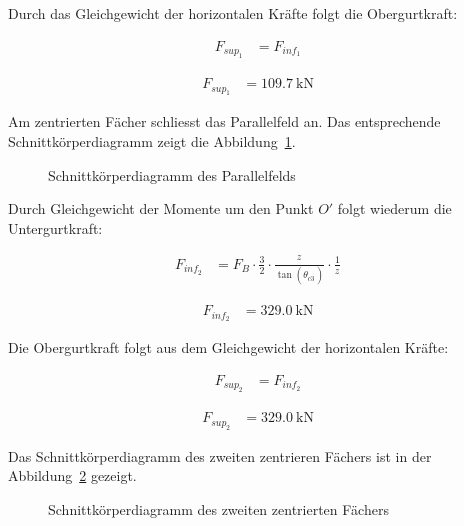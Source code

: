 \documentclass[
  11pt,
  letterpaper,
]{scrreprt}
\begin{document}
Durch das Gleichgewicht der horizontalen Kräfte folgt die Obergurtkraft:

$$
\begin{aligned}
F_{sup_{1}} &= F_{inf_{1}} \; 
\end{aligned}
$$

$$
\begin{aligned}
F_{sup_{1}} &= 109.7\ \mathrm{kN} \; 
\end{aligned}
$$

Am zentrierten Fächer schliesst das Parallelfeld an. Das entsprechende
Schnittkörperdiagramm zeigt die
Abbildung~\ref{fig-skd_2_spannungsfelder_sv14}.

\begin{figure}[H]


\caption{\label{fig-skd_2_spannungsfelder_sv14}Schnittkörperdiagramm des
Parallelfelds}

\end{figure}%

Durch Gleichgewicht der Momente um den Punkt \(O'\) folgt wiederum die
Untergurtkraft:

$$
\begin{aligned}
F_{inf_{2}} &= F_{B} \cdot \frac{ 3 }{ 2 } \cdot \frac{ z_{_{}} }{ \tan \left( \theta_{c3_{_{}}} \right) } \cdot \frac{1} { z_{_{}} } \; 
\end{aligned}
$$

$$
\begin{aligned}
F_{inf_{2}} &= 329.0\ \mathrm{kN} \;
\end{aligned}
$$

Die Obergurtkraft folgt aus dem Gleichgewicht der horizontalen Kräfte:

$$
\begin{aligned}
F_{sup_{2}} &= F_{inf_{2}} \; 
\end{aligned}
$$

$$
\begin{aligned}
F_{sup_{2}} &= 329.0\ \mathrm{kN} \; 
\end{aligned}
$$

Das Schnittkörperdiagramm des zweiten zentrieren Fächers ist in der
Abbildung~\ref{fig-skd_3_spannungsfelder_sv14} gezeigt.

\begin{figure}[H]


\caption{\label{fig-skd_3_spannungsfelder_sv14}Schnittkörperdiagramm des
zweiten zentrierten Fächers}

\end{figure}%
\end{document}
